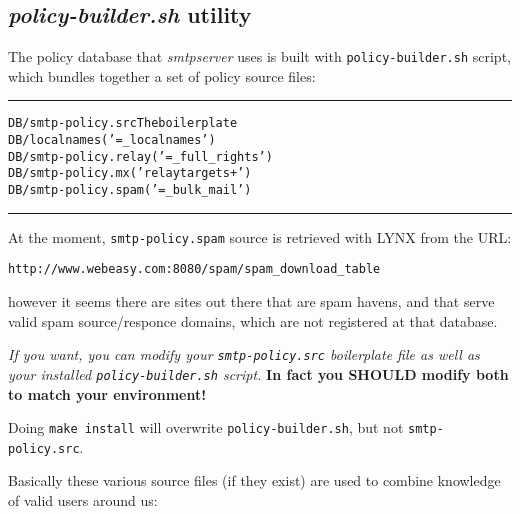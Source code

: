 \subsection{{\em policy-builder.sh} utility}
\label{ref:smtp_policy_builder}

The policy database that {\em smtpserver} uses is built with
{\tt policy-builder.sh} script, which bundles together a set
of policy source files:

\begin{alltt}\medskip\hrule\small\medskip
DB/smtp-policy.src   The boilerplate
DB/localnames        ('= _localnames')
DB/smtp-policy.relay ('= _full_rights')
DB/smtp-policy.mx    ('relaytargets +')
DB/smtp-policy.spam  ('= _bulk_mail')
\medskip\hrule\end{alltt}\medskip


At the moment, {\tt smtp-policy.spam} source is retrieved with LYNX from
the URL:
\begin{alltt}\medskip\scriptsize\medskip
http://www.webeasy.com:8080/spam/spam\_download\_table
\medskip\end{alltt}\medskip
however it seems there are sites out there that are spam havens, and
that serve valid spam source/responce domains, which are not registered
at that database.

{\em If you want, you can modify your {\tt smtp-policy.src} boilerplate
file as well as your installed {\tt\small policy-builder.sh} script.}
{\bf In fact you SHOULD modify both to match your environment!}

Doing {\tt make install} will overwrite {\tt\small policy-builder.sh},
but not {\tt smtp-policy.src}.

Basically these various source files (if they exist) are used to
combine knowledge of valid users around us:

